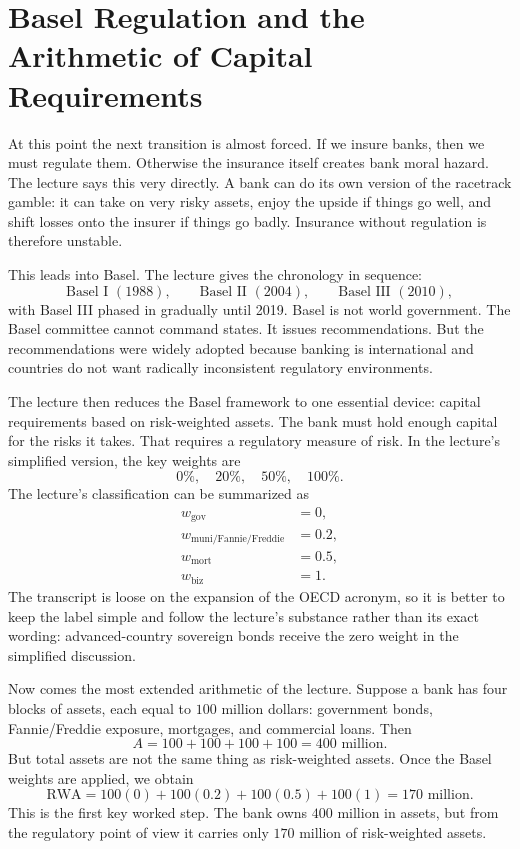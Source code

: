 \section{Basel Regulation and the Arithmetic of Capital Requirements}

At this point the next transition is almost forced. If we insure banks, then we must regulate them. Otherwise the insurance itself creates bank moral hazard. The lecture says this very directly. A bank can do its own version of the racetrack gamble: it can take on very risky assets, enjoy the upside if things go well, and shift losses onto the insurer if things go badly. Insurance without regulation is therefore unstable.

This leads into Basel. The lecture gives the chronology in sequence:
\begin{equation}
\text{Basel I }(1988),\qquad \text{Basel II }(2004),\qquad \text{Basel III }(2010),
\end{equation}
with Basel III phased in gradually until 2019. Basel is not world government. The Basel committee cannot command states. It issues recommendations. But the recommendations were widely adopted because banking is international and countries do not want radically inconsistent regulatory environments.

The lecture then reduces the Basel framework to one essential device: capital requirements based on risk-weighted assets. The bank must hold enough capital for the risks it takes. That requires a regulatory measure of risk. In the lecture's simplified version, the key weights are
\begin{equation}
0\%,\quad 20\%,\quad 50\%,\quad 100\%.
\end{equation}
The lecture's classification can be summarized as
\begin{align}
w_{\text{gov}} &= 0,\\
w_{\text{muni/Fannie/Freddie}} &= 0.2,\\
w_{\text{mort}} &= 0.5,\\
w_{\text{biz}} &= 1.
\end{align}
The transcript is loose on the expansion of the OECD acronym, so it is better to keep the label simple and follow the lecture's substance rather than its exact wording: advanced-country sovereign bonds receive the zero weight in the simplified discussion.

Now comes the most extended arithmetic of the lecture. Suppose a bank has four blocks of assets, each equal to \(100\) million dollars: government bonds, Fannie/Freddie exposure, mortgages, and commercial loans. Then
\begin{equation}
A = 100 + 100 + 100 + 100 = 400\text{ million}.
\end{equation}
But total assets are not the same thing as risk-weighted assets. Once the Basel weights are applied, we obtain
\begin{equation}
\text{RWA} = 100(0) + 100(0.2) + 100(0.5) + 100(1) = 170\text{ million}.
\end{equation}
This is the first key worked step. The bank owns \(400\) million in assets, but from the regulatory point of view it carries only \(170\) million of risk-weighted assets.

